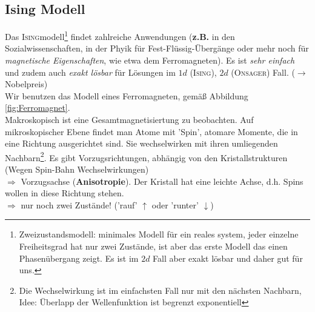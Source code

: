 \documentclass[12pt]{article}
\begin{document}
 
% 
 
 \subsection{Ising Modell}
 Das \textsc{Ising}modell\footnote{Zweizustandsmodell: minimales Modell für ein reales system, jeder einzelne Freiheitsgrad hat nur zwei Zustände, ist aber das erste Modell das einen Phasenübergang zeigt. Es ist im $2d$ Fall aber exakt lösbar und daher gut für uns.} findet zahlreiche Anwendungen (\textbf{z.B.} in den Sozialwissenschaften, in der Phyik für Fest-Flüssig-Übergänge oder mehr noch für \textit{magnetische Eigenschaften}, wie etwa dem Ferromagneten). Es ist \textit{sehr einfach} und zudem auch \textit{exakt lösbar} für Lösungen im $1d$ (\textsc{Ising}), $2d $ (\textsc{Onsager}) Fall.
($\to$ Nobelpreis) \\
Wir benutzen das Modell eines Ferromagneten, gemäß Abbildung \ref{fig:Ferromagnet}.  \\
Makroskopisch ist eine Gesamtmagnetisiertung zu beobachten. Auf mikroskopischer Ebene findet man Atome mit 'Spin', atomare Momente, die in eine Richtung ausgerichtet sind. Sie wechselwirken mit ihren umliegenden Nachbarn\footnote{ Die Wechselwirkung ist im einfachsten Fall nur mit den nächsten Nachbarn, Idee: Überlapp der Wellenfunktion ist begrenzt exponentiell}. Es gibt Vorzugsrichtungen, abhängig von den Kristallstrukturen (Wegen Spin-Bahn Wechselwirkungen) \\
$\Rightarrow$ Vorzugsachse (\textbf{Anisotropie}). Der Kristall hat eine leichte Achse, d.h. Spins wollen in diese Richtung stehen.\\
$\Rightarrow$ nur noch zwei Zustände! ('rauf' $\uparrow$ oder 'runter' $\downarrow$) \\
\end{document}
